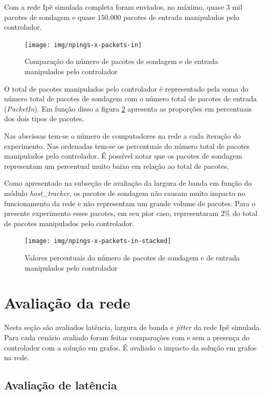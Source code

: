 Com a rede Ipê simulada completa foram enviados, no máximo, quase $3$ mil
pacotes de sondagem e quase $150.000$ pacotes de entrada manipulados pelo
controlador.
\break
\begin{figure}[!htb]
    \centering
    \label{fig:npings-x-packets-in}
    \texttt{[image: img/npings-x-packets-in]}
    \caption{Comparação do número de pacotes de sondagem e de entrada
    manipulados pelo controlador}
\end{figure}

O total de pacotes manipulados pelo controlador é representado pela soma
do número total de pacotes de sondagem com o número total de pacotes de
entrada (\emph{PacketIn}).
Em função disso a figura \ref{fig:npings-x-packets-in-stacked} apresenta
as proporções em percentuais dos dois tipos de pacotes.

Nas abscissas tem-se o número de computadores na rede a cada iteração do
experimento.
Nas ordenadas tem-se os percentuais do número total de pacotes manipulados
pelo controlador.
É possível notar que os pacotes de sondagem representam um percentual muito
baixo em relação ao total de pacotes.

Como apresentado na subseção de avaliação da largura de banda em função do
módulo \emph{host\_tracker}, os pacotes de sondagem não causam muito impacto
no funcionamento da rede e não representam um grande volume de pacotes.
Para o presente experimento esses pacotes, em seu pior caso, representaram
$2\%$ do total de pacotes manipulados pelo controlador.

\begin{figure}[!htb]
    \centering
    \label{fig:npings-x-packets-in-stacked}
    \texttt{[image: img/npings-x-packets-in-stacked]}
    \caption{Valores percentuais do número de pacotes de sondagem e de
        entrada manipulados pelo controlador}
\end{figure}

\section{Avaliação da rede}

Nesta seção são avaliados latência, largura de banda e \emph{jitter} da
rede Ipê simulada.
Para cada cenário avaliado foram feitas comparações com e sem a presença
do controlador com a solução em grafos.
É avaliado o impacto da solução em grafos na rede.

\subsection{Avaliação de latência}

